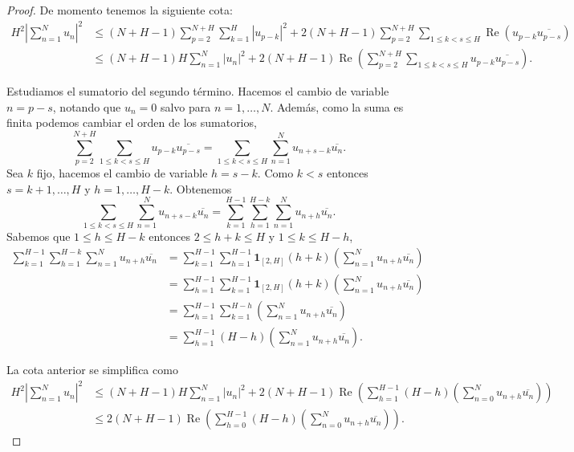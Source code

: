 \begin{proof}
    De momento tenemos la siguiente cota:
    \begin{align*}
        H^2 \left| \sum_{n=1}^{N} u_n \right|^2 
        &\leq (N+H-1) \sum_{p=2}^{N+H} \sum_{k=1}^{H} |u_{p-k}|^2 +
        2(N+H-1) \sum_{p=2}^{N+H} \sum_{1 \leq k < s \leq H} \operatorname{Re}(u_{p-k} \overline{u_{p-s}}) \\
        &\leq (N+H-1) H \sum_{n=1}^{N} |u_{n}|^2 +
        2(N+H-1) \operatorname{Re}\left(\sum_{p=2}^{N+H} \sum_{1 \leq k < s \leq H} u_{p-k} \overline{u_{p-s}}\right).
    \end{align*}

    Estudiamos el sumatorio del segundo término. Hacemos el cambio de variable $n = p-s$,
    notando que $u_n = 0$ salvo para $n=1,\dots,N$. Además, como la suma es finita podemos
    cambiar el orden de los sumatorios,
    \[
        \sum_{p=2}^{N+H} \sum_{1 \leq k < s \leq H} u_{p-k} \overline{u_{p-s}} =
        \sum_{1 \leq k < s \leq H} \sum_{n=1}^{N} u_{n+s-k} \overline{u_n}.
    \]
    Sea $k$ fijo, hacemos el cambio de variable $h = s-k$. Como $k < s$ entonces 
    $s = k+1, \dots, H$ y $h = 1, \dots, H-k$. Obtenemos
    \[
        \sum_{1 \leq k < s \leq H} \sum_{n=1}^{N} u_{n+s-k} \overline{u_n} =
        \sum_{k=1}^{H-1} \sum_{h=1}^{H-k} \sum_{n=1}^{N} u_{n+h} \overline{u_n}.
    \]
    Sabemos que $1 \leq h \leq H-k$ entonces $2 \leq h+k \leq H$ y $1 \leq k \leq H-h$,
    \begin{align*}
        \sum_{k=1}^{H-1} \sum_{h=1}^{H-k} \sum_{n=1}^{N} u_{n+h} \overline{u_n}  
        &=\sum_{k=1}^{H-1} \sum_{h=1}^{H-1} \mathbf{1}_{[2,H]}(h+k) \left(\sum_{n=1}^{N} u_{n+h} \overline{u_n} \right) \\
        &=\sum_{h=1}^{H-1} \sum_{k=1}^{H-1} \mathbf{1}_{[2,H]}(h+k) \left(\sum_{n=1}^{N} u_{n+h} \overline{u_n} \right) \\
        &=\sum_{h=1}^{H-1} \sum_{k=1}^{H-h} \left(\sum_{n=1}^{N} u_{n+h} \overline{u_n} \right) \\
        &=\sum_{h=1}^{H-1} (H-h) \left(\sum_{n=1}^{N} u_{n+h} \overline{u_n} \right).
     \end{align*}

     La cota anterior se simplifica como
     \begin{align*}
        H^2 \left| \sum_{n=1}^{N} u_n \right|^2 
        &\leq (N+H-1) H \sum_{n=1}^{N} |u_{n}|^2 + 2(N+H-1) \operatorname{Re}\left(\sum_{h=1}^{H-1} (H-h) \left(\sum_{n=0}^{N} u_{n+h} \overline{u_n} \right)\right) \\        
        &\leq 2(N+H-1) \operatorname{Re}\left(\sum_{h=0}^{H-1} (H-h) \left(\sum_{n=0}^{N} u_{n+h} \overline{u_n} \right)\right) .
    \end{align*}


\end{proof}
